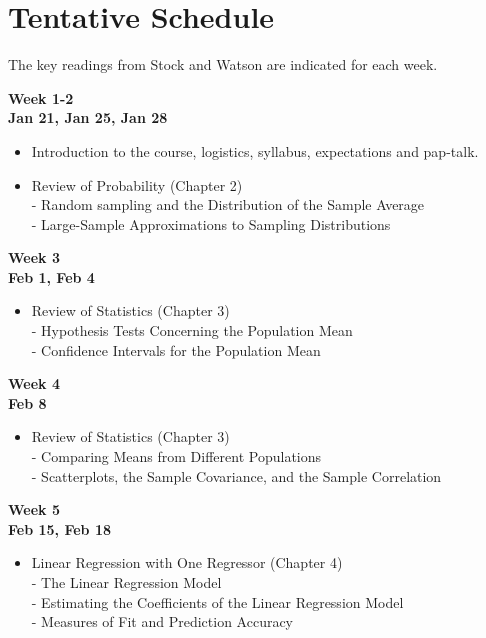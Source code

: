 \documentclass[
]{book}
\providecommand{\tightlist}{%
  \setlength{\itemsep}{0pt}\setlength{\parskip}{0pt}}
\begin{document}
\hypertarget{tentative-schedule}{%
\section*{Tentative Schedule}\label{tentative-schedule}}

The key readings from Stock and Watson are indicated for each week.

\textbf{Week 1-2}\\
\textbf{Jan 21, Jan 25, Jan 28}

\begin{itemize}
\tightlist
\item
  Introduction to the course, logistics, syllabus, expectations and pap-talk.\\
\item
  Review of Probability (Chapter 2)\\
  - Random sampling and the Distribution of the Sample Average\\
  - Large-Sample Approximations to Sampling Distributions
\end{itemize}

\textbf{Week 3}\\
\textbf{Feb 1, Feb 4}

\begin{itemize}
\tightlist
\item
  Review of Statistics (Chapter 3)\\
  - Hypothesis Tests Concerning the Population Mean\\
  - Confidence Intervals for the Population Mean
\end{itemize}

\textbf{Week 4}\\
\textbf{Feb 8}

\begin{itemize}
\tightlist
\item
  Review of Statistics (Chapter 3)\\
  - Comparing Means from Different Populations\\
  - Scatterplots, the Sample Covariance, and the Sample Correlation
\end{itemize}

\textbf{Week 5}\\
\textbf{Feb 15, Feb 18}

\begin{itemize}
\tightlist
\item
  Linear Regression with One Regressor (Chapter 4)\\
  - The Linear Regression Model\\
  - Estimating the Coefficients of the Linear Regression Model\\
  - Measures of Fit and Prediction Accuracy
\end{itemize}
\end{document}

